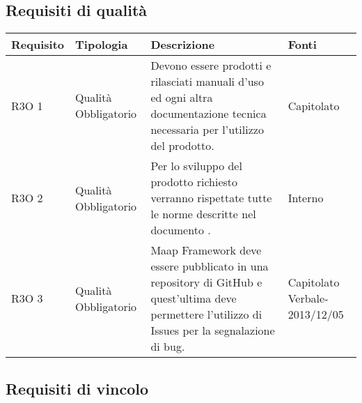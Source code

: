 \subsection{Requisiti di qualità }

      \begin{center}
      \bgroup
      \def\arraystretch{1.8}
      \begin{longtable}{ | l | p{2cm} | p{5cm} | p{1.7cm} |}
    
      \cellcolor[gray]{0.9} \textbf{Requisito} & \cellcolor[gray]{0.9} \textbf{Tipologia} 
      & \cellcolor[gray]{0.9} \textbf{Descrizione} & \cellcolor[gray]{0.9} \textbf{Fonti} \\ \hline
      
        R3O 1 & Qualità \newline  Obbligatorio  & Devono essere prodotti e rilasciati manuali d'uso ed ogni altra documentazione tecnica necessaria per l’utilizzo del prodotto. &  Capitolato \newline  \\ \hline      
        R3O 2 & Qualità \newline  Obbligatorio  & Per lo sviluppo del prodotto richiesto verranno rispettate tutte le norme descritte nel documento \NormeDiProgetto{}. &  Interno \newline  \\ \hline      
        R3O 3 & Qualità \newline  Obbligatorio  & Maap Framework deve essere pubblicato in una repository di GitHub e quest'ultima deve permettere l'utilizzo di Issues per la segnalazione di bug. &  Capitolato \newline  Verbale-2013/12/05 \newline  \\ \hline
      \end{longtable}
      \egroup
      \end{center}  
\clearpage

\subsection{Requisiti di vincolo }

